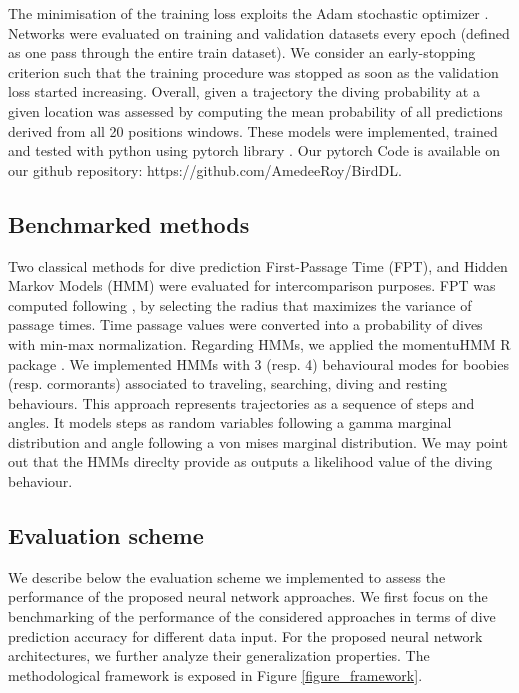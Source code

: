 \documentclass{article}
\begin{document}
The minimisation of the training loss exploits the Adam stochastic optimizer \cite{kingma_adam_2014}. Networks were evaluated on training and validation datasets every epoch (defined as one pass through the entire train dataset). We consider an early-stopping criterion such that the training procedure was stopped as soon as the validation loss started increasing. Overall, given a trajectory the diving probability at a given location was assessed by computing the mean probability of all predictions derived from all 20 positions windows. These models were implemented, trained and tested with python using pytorch library \cite{paskze_pytorch_2019}. Our pytorch Code is available on our github repository: https://github.com/AmedeeRoy/BirdDL.

\subsection{Benchmarked methods}
Two classical methods for dive prediction First-Passage Time (FPT), and Hidden Markov Models (HMM) were evaluated for intercomparison purposes. FPT was computed following \cite{fauchald_using_2003}, by selecting the radius that maximizes the variance of passage times. Time passage values were converted into a probability of dives with min-max normalization. Regarding HMMs, we applied the momentuHMM R package \cite{mcclintock_momentuhmm_2018}. We implemented HMMs with 3 (resp. 4) behavioural modes for boobies (resp. cormorants) associated to traveling, searching, diving and resting behaviours. This approach represents trajectories as a sequence of steps and angles. It models steps as random variables following a gamma marginal distribution and angle following a von mises marginal distribution. We may point out that the HMMs direclty provide as outputs a likelihood value of the diving behaviour.

\subsection{Evaluation scheme}
We describe below the evaluation scheme we implemented to assess the performance of the proposed neural network approaches. We first focus on the benchmarking of the performance of the considered approaches in terms of dive prediction accuracy for different data input. For the proposed neural network architectures, we further analyze their generalization properties. The methodological framework is exposed in Figure \ref{figure_framework}.
\end{document}
